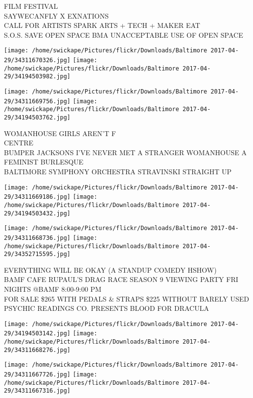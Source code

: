\documentclass[10pt,letterpaper]{article}
\begin{document}
FILM FESTIVAL\\
SAYWECANFLY X EXNATIONS\\
CALL FOR ARTISTS SPARK ARTS + TECH + MAKER EAT\\
S.O.S. SAVE OPEN SPACE BMA UNACCEPTABLE USE OF OPEN SPACE\\
\pagebreak

\texttt{[image: /home/swickape/Pictures/flickr/Downloads/Baltimore 2017-04-29/34311670326.jpg]}
\texttt{[image: /home/swickape/Pictures/flickr/Downloads/Baltimore 2017-04-29/34194503982.jpg]}

\texttt{[image: /home/swickape/Pictures/flickr/Downloads/Baltimore 2017-04-29/34311669756.jpg]}
\texttt{[image: /home/swickape/Pictures/flickr/Downloads/Baltimore 2017-04-29/34194503762.jpg]}

WOMANHOUSE GIRLS AREN'T F\\
CENTRE\\
BUMPER JACKSONS I'VE NEVER MET A STRANGER WOMANHOUSE A FEMINIST BURLESQUE\\
BALTIMORE SYMPHONY ORCHESTRA STRAVINSKI STRAIGHT UP\\
\pagebreak

\texttt{[image: /home/swickape/Pictures/flickr/Downloads/Baltimore 2017-04-29/34311669186.jpg]}
\texttt{[image: /home/swickape/Pictures/flickr/Downloads/Baltimore 2017-04-29/34194503432.jpg]}

\texttt{[image: /home/swickape/Pictures/flickr/Downloads/Baltimore 2017-04-29/34311668736.jpg]}
\texttt{[image: /home/swickape/Pictures/flickr/Downloads/Baltimore 2017-04-29/34352715595.jpg]}

EVERYTHING WILL BE OKAY (A STANDUP COMEDY HSHOW)\\
BAMF CAFE RUPAUL'S DRAG RACE SEASON 9 VIEWING PARTY FRI NIGHTS @BAMF 8:00{-}9:00 PM\\
FOR SALE \$265 WITH PEDALS \& STRAPS \$225 WITHOUT BARELY USED\\
PSYCHIC READINGS CO. PRESENTS BLOOD FOR DRACULA\\
\pagebreak

\texttt{[image: /home/swickape/Pictures/flickr/Downloads/Baltimore 2017-04-29/34194503142.jpg]}
\texttt{[image: /home/swickape/Pictures/flickr/Downloads/Baltimore 2017-04-29/34311668276.jpg]}

\texttt{[image: /home/swickape/Pictures/flickr/Downloads/Baltimore 2017-04-29/34311667726.jpg]}
\texttt{[image: /home/swickape/Pictures/flickr/Downloads/Baltimore 2017-04-29/34311667316.jpg]}
\end{document}
